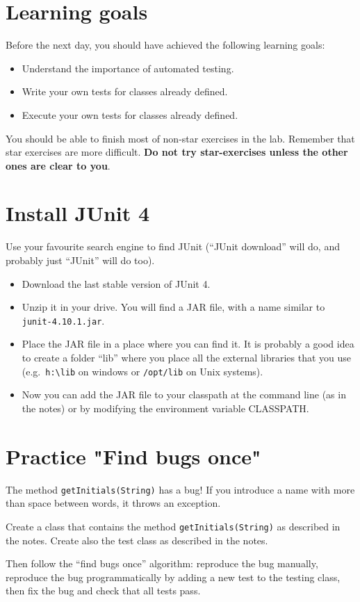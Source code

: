 \documentclass{article}
\begin{document}
\section*{Learning goals}
\label{sec:learning-goals}

Before the next day, you should have achieved the following learning
goals: 

\begin{itemize}
\item Understand the importance of automated testing. 
\item Write your own tests for classes already defined. 
\item Execute your own tests for classes already defined. 
\end{itemize}

You should be able to finish most of non-star exercises in the lab. 
Remember that star exercises are more difficult. 
\textbf{Do not try star-exercises unless the other ones are clear to
  you}.  


\section{Install JUnit 4}
\label{sec:install-junit-4}

Use your favourite search engine to find JUnit (``JUnit download''
will do, and probably just ``JUnit'' will do too). 

\begin{itemize}
\item Download the last stable version of JUnit 4.
\item Unzip it in your drive. You will find a JAR file, with a name
  similar to \verb+junit-4.10.1.jar+.
\item Place the JAR file in a place where you can find it. It is
  probably a good idea to create a folder ``lib'' where you place all
  the external libraries that you use (e.g.~\verb+h:\lib+ on windows
  or \verb+/opt/lib+ on Unix systems).
\item Now you can add the JAR file to your classpath at the command
  line (as in the notes) or by modifying the environment variable
  CLASSPATH. 
\end{itemize}

\section{Practice "Find bugs once"}
\label{sec:practice-find-bugs}

The method \verb+getInitials(String)+ has a bug! If you introduce a
name with more than space between words, it throws an exception.

Create a class that contains the method \verb+getInitials(String)+ as
described in the notes. Create also the test class as described in the
notes. 

Then follow the ``find bugs once'' algorithm: reproduce the bug manually,
reproduce the bug programmatically by adding a new test to the testing
class, then fix the bug and check that all tests pass. 
\end{document}

